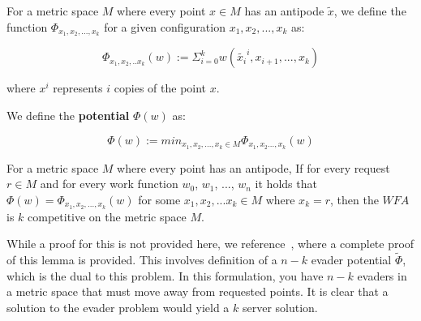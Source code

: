\begin{definition}
    For a metric space $M$ where every point $x \in M$ has an antipode $\tilde{x}$, we define the function \textbf{$\Phi_{x_1, x_2, ..., x_k}$} for a given configuration $x_1, x_2, ..., x_k$ as:

    \begin{equation*}
        \Phi_{x_1, x_2, ..x_k}(w) := \Sigma_{i=0}^k w(\tilde{x_i}^i, x_{i+1}, ..., x_k)
    \end{equation*}

    where $x^i$ represents $i$ copies of the point $x$.
\end{definition}

\begin{definition}
    We define the \textbf{potential} $\Phi (w)$ as:

    \begin{equation*}
        \Phi(w) := min_{x_1, x_2, ..., x_k \in M} \Phi_{x_1, x_2..., x_k} (w)
    \end{equation*}
\end{definition}

\begin{lemma}
    For a metric space $M$ where every point has an antipode, If for every request $r \in M$ and for every work function $w_0$, $w_1$, ..., $w_n$ it holds that $\Phi(w) = \Phi_{x_1, x_2, ..., x_k}(w)$ for some $x_1, x_2, ...x_k \in M$ where $x_k = r$, then the $WFA$ is $k$ competitive on the metric space $M$.
\end{lemma}

While a proof for this is not provided here, we reference~\cite{unifyingPotential2021}, where a complete proof of this lemma is provided. This involves definition of a $n-k$ evader potential $\tilde{\Phi}$, which is the dual to this problem. In this formulation, you have $n-k$ evaders in a metric space that must move away from requested points. It is clear that a solution to the evader problem would yield a $k$ server solution.